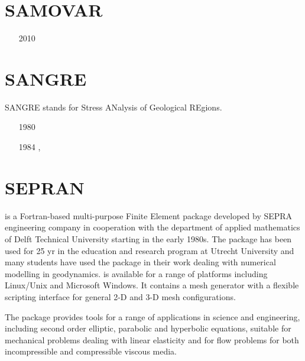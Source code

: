 \section{SAMOVAR}

\begin{small}
\begin{itemize}
\item[2010] \textcite{elga10}
\end{itemize}
\end{small}

\section{SANGRE} 
SANGRE stands for Stress ANalysis of Geological REgions.

\begin{small}
\begin{itemize}
\item[1980] \textcite{anbr80}
\item[1984] \textcite{flyu84}, \textcite{flyu84b}
\end{itemize}
\end{small}

\section{SEPRAN}

\sepran \cite{sepr05} is a Fortran-based
multi-purpose Finite Element package developed by SEPRA engineering company in
cooperation with the department of applied mathematics of Delft Technical University
starting in the early 1980s. The package has been used for 25 yr in the education and
research program at Utrecht University and many students have used the package in
their work dealing with numerical modelling in geodynamics. \sepran is available for
a range of platforms including Linux/Unix and Microsoft Windows. It contains a mesh
generator with a flexible scripting interface for general 2-D and 3-D mesh configurations.

The package provides tools for a range of applications in science and engineering, including 
second order elliptic, parabolic and hyperbolic equations, suitable for mechanical 
problems dealing with linear elasticity and for flow problems for both incompressible
and compressible viscous media.

